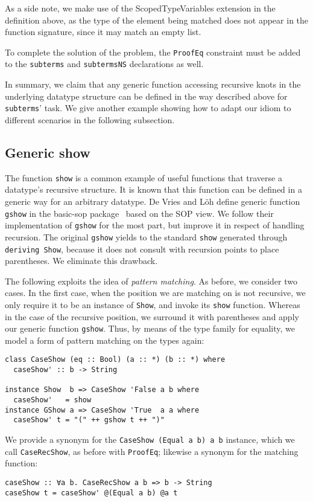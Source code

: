 \documentclass[runningheads]{llncs}
\newcommand{\K}[1]{\lstinline{#1}}
\begin{document}
As a side note, we make use of the \textsf{ScopedTypeVariables} extension in the definition above, as the type of the element being matched does not appear in the function signature, since it may match an empty list. 

To complete the solution of the problem, the \K{ProofEq} constraint must be added to the \K{subterms} and \K{subtermsNS} declarations as well.

In summary, we claim that any generic function accessing recursive knots in the underlying datatype structure can be defined in the way described above for \K{subterms}' task. We give another example showing how to adapt our idiom to different scenarios in the following subsection.

\subsection{Generic show}
\label{subsec:gshow}

The function \K{show} is a common example of useful functions that traverse a datatype's recursive structure. It is known that this function can be defined in a generic way for an arbitrary datatype. De Vries and L\"{o}h define generic function \K{gshow} in the \textsf{basic-sop} package~\cite{basic-sop} based on the SOP view. We follow their implementation of \K{gshow} for the most part, but improve it in respect of handling recursion. The original \K{gshow} yields to the standard \K{show} generated through \K{deriving Show}, because it does not consult with recursion points to place parentheses. We eliminate this drawback.

The following exploits the idea of \emph{pattern matching}. As before, we consider two cases. In the first case, when the position we are matching on is not recursive, we only require it to be an  instance of \K{Show}, and invoke its \K{show} function. Whereas in the case of the recursive position, we surround it with parentheses and apply our generic function \K{gshow}. Thus, by means of the type family for equality, we model a form of pattern matching on the types again:
\begin{lstlisting}
class CaseShow (eq :: Bool) (a :: *) (b :: *) where
  caseShow' :: b -> String

instance Show  b => CaseShow 'False a b where
  caseShow'   = show
instance GShow a => CaseShow 'True  a a where
  caseShow' t = "(" ++ gshow t ++ ")"
\end{lstlisting}
We provide a synonym for the \K{CaseShow (Equal a b) a b} instance, which we call \K{CaseRecShow}, as before with \K{ProofEq}; likewise a synonym for the matching function:
\begin{lstlisting}
caseShow :: ∀a b. CaseRecShow a b => b -> String
caseShow t = caseShow' @(Equal a b) @a t
\end{lstlisting}
\end{document}

